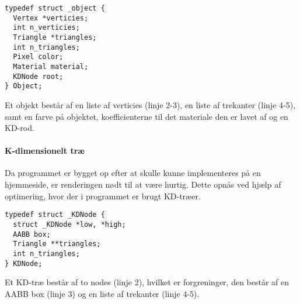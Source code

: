 \begin{lstlisting}[style=Cstyle, caption=Structs til objektet]
typedef struct _object {
  Vertex *verticies;
  int n_verticies;
  Triangle *triangles;
  int n_triangles;
  Pixel color;
  Material material;
  KDNode root;
} Object;
\end{lstlisting}

Et objekt består af en liste af verticies (linje 2-3), en liste af trekanter (linje 4-5), samt en farve på objektet, koefficienterne til det materiale den er lavet af og en KD-rod.

\paragraph{K-dimensionelt træ}
Da programmet er bygget op efter at skulle kunne implementeres på en hjemmeside, er renderingen nødt til at være hurtig. Dette opnås ved hjælp af optimering, hvor der i programmet er brugt KD-træer.

\begin{lstlisting}[style=Cstyle, caption=Struct til KDNode]
typedef struct _KDNode {
  struct _KDNode *low, *high;
  AABB box;
  Triangle **triangles;
  int n_triangles;
} KDNode;
\end{lstlisting}

Et KD-træ består af to nodes (linje 2), hvilket er forgreninger, den består af en AABB box (linje 3) og en liste af trekanter (linje 4-5).